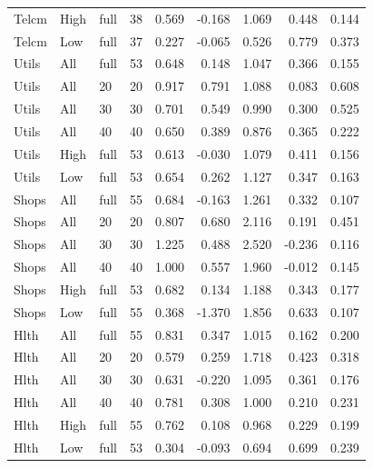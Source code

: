 \documentclass[10pt]{article}
\begin{document}
\begin{landscape}
\begin{longtable}{lllrrrrrr}
Telcm & High & full & 38 & 0.569 & -0.168 & 1.069 & 0.448 & 0.144 \\
Telcm & Low & full & 37 & 0.227 & -0.065 & 0.526 & 0.779 & 0.373 \\
Utils & All & full & 53 & 0.648 & 0.148 & 1.047 & 0.366 & 0.155 \\
Utils & All & 20 & 20 & 0.917 & 0.791 & 1.088 & 0.083 & 0.608 \\
Utils & All & 30 & 30 & 0.701 & 0.549 & 0.990 & 0.300 & 0.525 \\
Utils & All & 40 & 40 & 0.650 & 0.389 & 0.876 & 0.365 & 0.222 \\
Utils & High & full & 53 & 0.613 & -0.030 & 1.079 & 0.411 & 0.156 \\
Utils & Low & full & 53 & 0.654 & 0.262 & 1.127 & 0.347 & 0.163 \\
Shops & All & full & 55 & 0.684 & -0.163 & 1.261 & 0.332 & 0.107 \\
Shops & All & 20 & 20 & 0.807 & 0.680 & 2.116 & 0.191 & 0.451 \\
Shops & All & 30 & 30 & 1.225 & 0.488 & 2.520 & -0.236 & 0.116 \\
Shops & All & 40 & 40 & 1.000 & 0.557 & 1.960 & -0.012 & 0.145 \\
Shops & High & full & 53 & 0.682 & 0.134 & 1.188 & 0.343 & 0.177 \\
Shops & Low & full & 55 & 0.368 & -1.370 & 1.856 & 0.633 & 0.107 \\
Hlth & All & full & 55 & 0.831 & 0.347 & 1.015 & 0.162 & 0.200 \\
Hlth & All & 20 & 20 & 0.579 & 0.259 & 1.718 & 0.423 & 0.318 \\
Hlth & All & 30 & 30 & 0.631 & -0.220 & 1.095 & 0.361 & 0.176 \\
Hlth & All & 40 & 40 & 0.781 & 0.308 & 1.000 & 0.210 & 0.231 \\
Hlth & High & full & 55 & 0.762 & 0.108 & 0.968 & 0.229 & 0.199 \\
Hlth & Low & full & 53 & 0.304 & -0.093 & 0.694 & 0.699 & 0.239 \\
\end{longtable}


\end{landscape}
\end{document}
